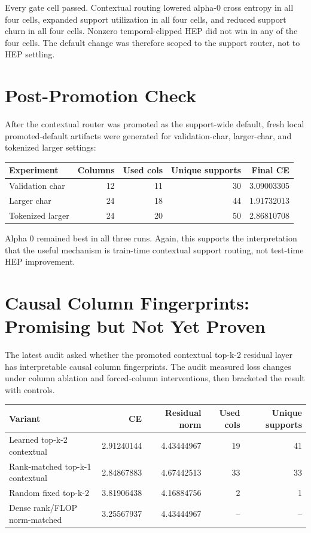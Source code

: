 \documentclass[11pt]{article}
\begin{document}
Every gate cell passed. Contextual routing lowered alpha-0 cross entropy in
all four cells, expanded support utilization in all four cells, and reduced
support churn in all four cells. Nonzero temporal-clipped HEP did not win in
any of the four cells. The default change was therefore scoped to the support
router, not to HEP settling.

\section{Post-Promotion Check}

After the contextual router was promoted as the support-wide default, fresh
local promoted-default artifacts were generated for validation-char,
larger-char, and tokenized larger settings:

\begin{center}
\begin{tabular}{lrrrr}
\toprule
Experiment & Columns & Used cols & Unique supports & Final CE \\
\midrule
Validation char & 12 & 11 & 30 & 3.09003305 \\
Larger char & 24 & 18 & 44 & 1.91732013 \\
Tokenized larger & 24 & 20 & 50 & 2.86810708 \\
\bottomrule
\end{tabular}
\end{center}

Alpha 0 remained best in all three runs. Again, this supports the interpretation
that the useful mechanism is train-time contextual support routing, not
test-time HEP improvement.

\section{Causal Column Fingerprints: Promising but Not Yet Proven}

The latest audit asked whether the promoted contextual top-k-2 residual layer
has interpretable causal column fingerprints. The audit measured loss changes
under column ablation and forced-column interventions, then bracketed the
result with controls.

\begin{center}
\begin{tabular}{lrrrr}
\toprule
Variant & CE & Residual norm & Used cols & Unique supports \\
\midrule
Learned top-k-2 contextual & 2.91240144 & 4.43444967 & 19 & 41 \\
Rank-matched top-k-1 contextual & 2.84867883 & 4.67442513 & 33 & 33 \\
Random fixed top-k-2 & 3.81906438 & 4.16884756 & 2 & 1 \\
Dense rank/FLOP norm-matched & 3.25567937 & 4.43444967 & -- & -- \\
\bottomrule
\end{tabular}
\end{center}
\end{document}
